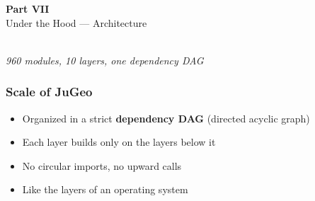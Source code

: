 \providecommand{\jugmark}[1]{\textbf{\color{jugeoBlue}#1}}

\begin{frame}
\frametitle{}
\vfill
\begin{center}
  {\Huge\color{jugeoBlue}\textbf{Part VII}}\\[12pt]
  {\LARGE\color{jugeoDark}Under the Hood --- Architecture}\\[20pt]
  \\[12pt]
  {\large\color{gray}\itshape 960 modules, 10 layers, one dependency DAG}
\end{center}
\vfill
\end{frame}

\begin{frame}
\frametitle{Scale of JuGeo}
\begin{center}
\end{center}
\vfill
\begin{itemize}
  \item Organized in a strict \jugmark{dependency DAG} (directed acyclic graph)
  \item Each layer builds only on the layers below it
  \item No circular imports, no upward calls
  \item Like the layers of an operating system
\end{itemize}
\end{frame}

